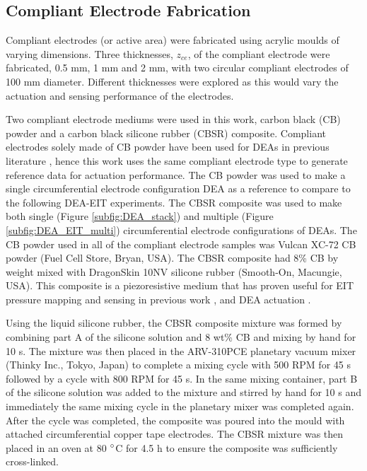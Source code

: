 \subsection{Compliant Electrode Fabrication}
\label{subsec:dea_elec_fab}
Compliant electrodes (or active area) were fabricated using acrylic moulds of varying dimensions. Three thicknesses, $z_{ce}$, of the compliant electrode were fabricated, 0.5 mm, 1 mm and 2 mm, with two circular compliant electrodes of 100 mm diameter. Different thicknesses were explored as this would vary the actuation and sensing performance of the electrodes.

Two compliant electrode mediums were used in this work, carbon black (CB) powder and a carbon black silicone rubber (CBSR) composite. Compliant electrodes solely made of CB powder have been used for DEAs in previous literature \cite{Carpi2015, Huang2022, Shigemune2018} , hence this work uses the same compliant electrode type to generate reference data for actuation performance. The CB powder was used to make a single circumferential electrode configuration DEA as a reference to compare to the following DEA-EIT experiments. The CBSR composite was used to make both single (Figure \ref{subfig:DEA_stack}) and multiple (Figure \ref{subfig:DEA_EIT_multi}) circumferential electrode configurations of DEAs. The CB powder used in all of the compliant electrode samples was Vulcan XC-72 CB powder (Fuel Cell Store, Bryan, USA). The CBSR composite had 8\% CB by weight mixed with DragonSkin 10NV silicone rubber (Smooth-On, Macungie, USA). This composite is a piezoresistive medium that has proven useful for EIT pressure mapping and sensing in previous work \cite{Ellingham2024} , and DEA actuation \cite{Carpi2015, Huang2022}.

Using the liquid silicone rubber, the CBSR composite mixture was formed by combining part A of the silicone solution and 8 wt\% CB and mixing by hand for 10 s. The mixture was then placed in the ARV-310PCE planetary vacuum mixer (Thinky Inc., Tokyo, Japan) to complete a mixing cycle with 500 RPM for 45 s followed by a cycle with 800 RPM for 45 s. In the same mixing container, part B of the silicone solution was added to the mixture and stirred by hand for 10 s and immediately the same mixing cycle in the planetary mixer was completed again. After the cycle was completed, the composite was poured into the mould with attached circumferential copper tape electrodes. The CBSR mixture was then placed in an oven at 80 $\degree$C for 4.5 h to ensure the composite was sufficiently cross-linked.

